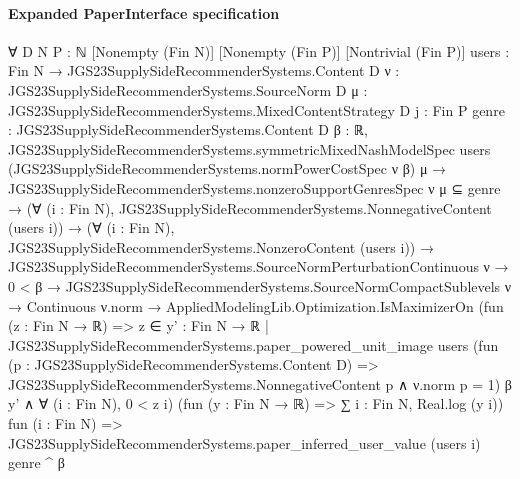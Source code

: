 \documentclass[10pt]{article}
\begin{document}
\paragraph{Expanded PaperInterface specification}
\begin{ReviewVerbatim}
∀ {D N P : ℕ} [Nonempty (Fin N)] [Nonempty (Fin P)] [Nontrivial (Fin P)]
  {users : Fin N → JGS23SupplySideRecommenderSystems.Content D} {ν : JGS23SupplySideRecommenderSystems.SourceNorm D}
  {μ : JGS23SupplySideRecommenderSystems.MixedContentStrategy D} {j : Fin P}
  {genre : JGS23SupplySideRecommenderSystems.Content D} {β : ℝ},
  JGS23SupplySideRecommenderSystems.symmetricMixedNashModelSpec users
      (JGS23SupplySideRecommenderSystems.normPowerCostSpec ν β) μ →
    JGS23SupplySideRecommenderSystems.nonzeroSupportGenresSpec ν μ ⊆ {genre} →
      (∀ (i : Fin N), JGS23SupplySideRecommenderSystems.NonnegativeContent (users i)) →
        (∀ (i : Fin N), JGS23SupplySideRecommenderSystems.NonzeroContent (users i)) →
          JGS23SupplySideRecommenderSystems.SourceNormPerturbationContinuous ν →
            0 < β →
              JGS23SupplySideRecommenderSystems.SourceNormCompactSublevels ν →
                Continuous ν.norm →
                  AppliedModelingLib.Optimization.IsMaximizerOn
                    (fun (z : Fin N → ℝ) =>
                      z ∈
                          {y' : Fin N → ℝ |
                            JGS23SupplySideRecommenderSystems.paper_powered_unit_image users
                              (fun (p : JGS23SupplySideRecommenderSystems.Content D) =>
                                JGS23SupplySideRecommenderSystems.NonnegativeContent p ∧ ν.norm p = 1)
                              β y'} ∧
                        ∀ (i : Fin N), 0 < z i)
                    (fun (y : Fin N → ℝ) => ∑ i : Fin N, Real.log (y i)) fun (i : Fin N) =>
                    JGS23SupplySideRecommenderSystems.paper_inferred_user_value (users i) genre ^ β
\end{ReviewVerbatim}
\end{document}
